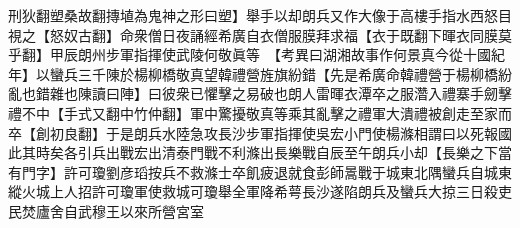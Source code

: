 刑狄翻塑桑故翻摶埴為鬼神之形曰塑】舉手以却朗兵又作大像于高樓手指水西怒目視之【怒奴古翻】命衆僧日夜誦經希廣自衣僧服膜拜求福【衣于既翻下暉衣同膜莫乎翻】甲辰朗州步軍指揮使武陵何敬眞等　【考異曰湖湘故事作何景真今從十國紀年】以蠻兵三千陳於楊柳橋敬真望韓禮營旌旗紛錯【先是希廣命韓禮營于楊柳橋紛亂也錯雜也陳讀曰陣】曰彼衆已懼擊之易破也朗人雷暉衣潭卒之服濳入禮寨手劒擊禮不中【手式又翻中竹仲翻】軍中驚擾敬真等乘其亂擊之禮軍大潰禮被創走至家而卒【創初良翻】于是朗兵水陸急攻長沙步軍指揮使吳宏小門使楊滌相謂曰以死報國此其時矣各引兵出戰宏出清泰門戰不利滌出長樂戰自辰至午朗兵小却【長樂之下當有門字】許可瓊劉彦瑫按兵不救滌士卒飢疲退就食彭師暠戰于城東北隅蠻兵自城東縱火城上人招許可瓊軍使救城可瓊舉全軍降希萼長沙遂陷朗兵及蠻兵大掠三日殺吏民焚廬舍自武穆王以來所營宮室